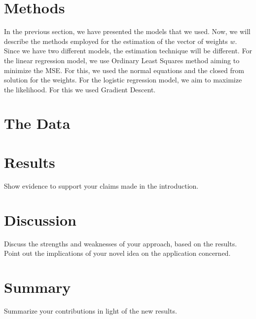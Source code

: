 \documentclass[10pt,conference,compsocconf]{IEEEtran}
\begin{document}
\section{Methods}
In the previous section, we have presented the models that we used. Now, we will describe the methods employed for the estimation of the vector of weights $w$. Since we have two different models, the estimation technique will be different. 
For the linear regression model, we use Ordinary Least Squares method aiming to minimize the MSE. For this, we used the normal equations and the closed from solution for the weights. 
For the logistic regression model, we aim to maximize the likelihood. For this we used Gradient Descent. 


\section{The Data}
\label{S1}

\section{Results}
\label{S1}
  Show evidence to support your claims made in the
introduction.
\section{Discussion}
\label{S1}
  Discuss the strengths and weaknesses of your
approach, based on the results. Point out the implications of your
novel idea on the application concerned.
\section{Summary}
\label{S1}
  Summarize your contributions in light of the new
results.
\end{document}
